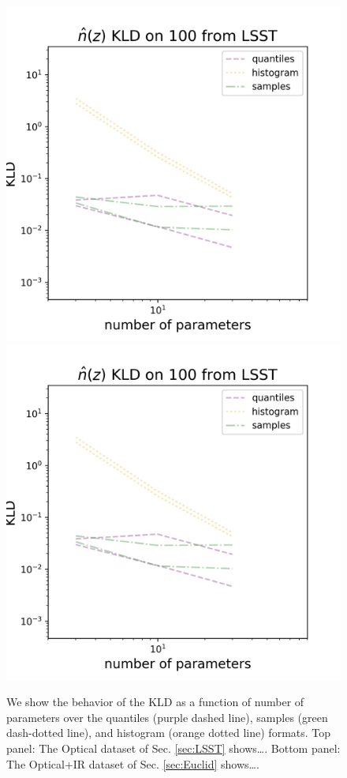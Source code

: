 \documentclass[\docopts]{\docclass}
\begin{document}
\begin{figure}
  
\includegraphics[width=0.9\columnwidth]{figures/lsst_stacked_placeholder.png}\\
  \includegraphics[width=0.9\columnwidth]{figures/lsst_stacked_placeholder.png}
  \caption{We show the behavior of the KLD as a function of number of 
parameters over the quantiles (purple dashed line), samples (green dash-dotted 
line), and histogram (orange dotted line) formats.  Top panel: The Optical 
dataset of Sec. \ref{sec:LSST} shows\dots.  Bottom panel: The Optical+IR 
dataset of Sec. \ref{sec:Euclid} shows\dots.
  \label{fig:kld}}
\end{figure}
\end{document}
